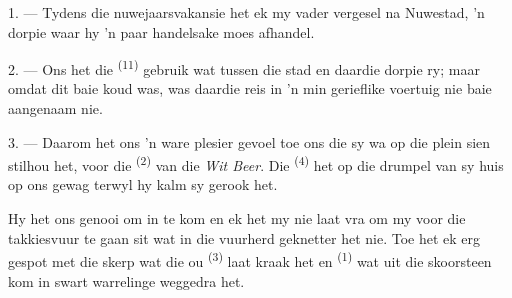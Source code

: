 %
%
%


\VUsaut{4.0mm}
\VUsaut{3.0mm}
\VUfilet{16mm}
\VUsaut{5.6mm}
\VUsaut{3.0mm}

\VUsaut{3.0mm}

\VUsaut{4.0mm}

1. --- Tydens die nuwejaarsvakansie het ek my vader vergesel na Nuwestad, 'n dorpie waar
hy 'n paar handelsake moes afhandel.

2. --- Ons het die  \textsuperscript{(11)} gebruik wat tussen die stad
en daardie dorpie ry; maar omdat dit baie koud was, was daardie reis in 'n min gerieflike
voertuig nie baie aangenaam nie.

3. --- Daarom het ons 'n ware plesier gevoel toe ons die  sy wa op die
plein sien stilhou het, voor die  \textsuperscript{(2)} van die
\textit{Wit Beer}. Die  \textsuperscript{(4)} het op die drumpel van
sy huis op ons gewag terwyl hy kalm sy  gerook het.

Hy het ons genooi om in te kom en ek het my nie laat vra om my voor die takkiesvuur te
gaan sit wat in die vuurherd geknetter het nie. Toe het ek erg gespot met die skerp
 wat die ou  \textsuperscript{(3)} laat kraak het
en  \textsuperscript{(1)} wat uit die skoorsteen kom in swart warrelinge
weggedra het.

